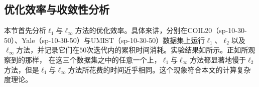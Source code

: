 \subsection{优化效率与收敛性分析}
本节首先分析$\ell_{1}$与$\ell_{\infty}$方法的优化效率。具体来讲，分别在COIL20（sp-10-30-50）、Yale（sp-10-30-50）与UMIST（sp-10-30-50）数据集上运行$\ell_{1}$、$\ell_{2}$以及$\ell_{\infty}$方法，并记录它们在$50$次迭代内的累积时间消耗。实验结果如所示。正如所观察到的那样，
在这三个数据集之中的任意一个上，$\ell_{1}$与$\ell_{\infty}$方法都显著地慢于$\ell_{2}$方法，但是$\ell_{1}$与$\ell_{\infty}$方法所花费的时间近乎相同。这个现象符合本文的计算复杂度理论。

